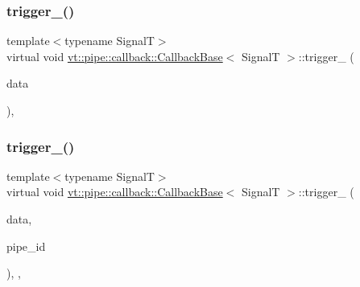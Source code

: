 \mbox{\label{structvt_1_1pipe_1_1callback_1_1_callback_base_a75a9b0103e0129f536385b10b86400c3}} 
\subsubsection{\texorpdfstring{trigger\+\_\+()}{trigger\_()}\hspace{0.1cm}{\footnotesize\ttfamily [1/2]}}
{\footnotesize\ttfamily template$<$typename SignalT$>$ \\
virtual void \hyperlink{structvt_1_1pipe_1_1callback_1_1_callback_base}{vt\+::pipe\+::callback\+::\+Callback\+Base}$<$ SignalT $>$\+::trigger\+\_\+ (\begin{DoxyParamCaption}\item[{\hyperlink{structvt_1_1pipe_1_1callback_1_1_callback_base_aa1c1fd83b75220a50f6dcd7c1617726e}{Signal\+Data\+Type} $\ast$}]{data }\end{DoxyParamCaption})\hspace{0.3cm}{\ttfamily [protected]}, {}}

\mbox{\label{structvt_1_1pipe_1_1callback_1_1_callback_base_ae4a19fced0abfb6543d4417efeb7e831}} 
\subsubsection{\texorpdfstring{trigger\+\_\+()}{trigger\_()}\hspace{0.1cm}{\footnotesize\ttfamily [2/2]}}
{\footnotesize\ttfamily template$<$typename SignalT$>$ \\
virtual void \hyperlink{structvt_1_1pipe_1_1callback_1_1_callback_base}{vt\+::pipe\+::callback\+::\+Callback\+Base}$<$ SignalT $>$\+::trigger\+\_\+ (\begin{DoxyParamCaption}\item[{\hyperlink{structvt_1_1pipe_1_1callback_1_1_callback_base_aa1c1fd83b75220a50f6dcd7c1617726e}{Signal\+Data\+Type} $\ast$}]{data,  }\item[{\mbox{[}\mbox{[}maybe\+\_\+unused\mbox{]} \mbox{]} \hyperlink{namespacevt_ac9852acda74d1896f48f406cd72c7bd3}{Pipe\+Type} const \&}]{pipe\+\_\+id }\end{DoxyParamCaption})\hspace{0.3cm}{\ttfamily [inline]}, {\ttfamily [protected]}, {\ttfamily [virtual]}}



